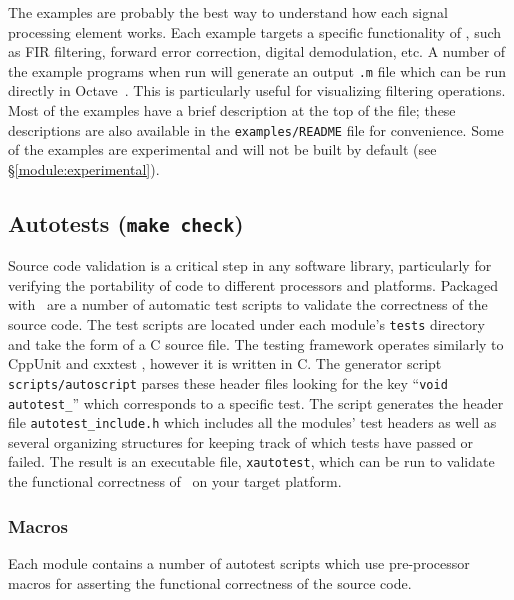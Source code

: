 The examples are probably the best way to understand how each signal
processing element works.
Each example targets a specific functionality of \liquid,
such as FIR filtering, forward error correction, digital demodulation,
etc.
A number of the example programs when run will generate an output
{\tt .m} file which can be run directly in Octave~\cite{octave:web}.
This is particularly useful for visualizing filtering operations.
Most of the examples have a brief description at the top of the file;
these descriptions are also available in the {\tt examples/README} file
for convenience.
Some of the examples are experimental and will not be built by default
(see \S\ref{module:experimental}).

\subsection{Autotests ({\tt make check})}
\label{section:installation:targets:autotests}
Source code validation is a critical step in any software library,
particularly for verifying the portability of code to different processors and
platforms.
Packaged with \liquid\ are a number of automatic test scripts to validate the
correctness of the source code.
The test scripts are located under each module's {\tt tests} directory and
take the form of a C source file.
The testing framework operates similarly to CppUnit \cite{cppunit:web} and
cxxtest \cite{cxxtest:web}, however it is written in C.
The generator script {\tt scripts/autoscript} parses these header files looking for
the key ``{\tt void autotest\_}'' which corresponds to a specific test.
The script generates the header file {\tt autotest\_include.h} which
includes all the modules' test headers as well as several organizing
structures for keeping track of which tests have passed or failed.
The result is an executable file, {\tt xautotest}, which can be run to
validate the functional correctness of \liquid\ on your target platform.

\subsubsection{Macros}
Each module contains a number of autotest scripts which use pre-processor
macros for asserting the functional correctness of the source code.

